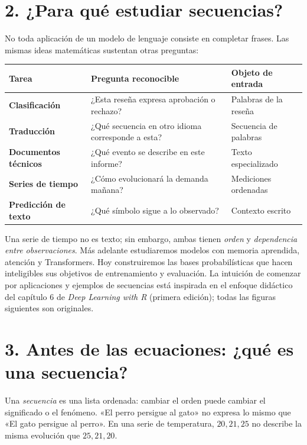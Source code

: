 \section*{2. ¿Para qué estudiar secuencias?}
No toda aplicación de un modelo de lenguaje consiste en completar frases. Las mismas ideas matemáticas sustentan otras preguntas:
\begin{center}
\begin{tabularx}{\textwidth}{>{\bfseries}p{3.0cm}X>{\raggedright\arraybackslash}p{3.4cm}}
\toprule Tarea & Pregunta reconocible & Objeto de entrada\\\midrule
Clasificación & ¿Esta reseña expresa aprobación o rechazo? & Palabras de la reseña\\
Traducción & ¿Qué secuencia en otro idioma corresponde a esta? & Secuencia de palabras\\
Documentos técnicos & ¿Qué evento se describe en este informe? & Texto especializado\\
Series de tiempo & ¿Cómo evolucionará la demanda mañana? & Mediciones ordenadas\\
Predicción de texto & ¿Qué símbolo sigue a lo observado? & Contexto escrito\\\bottomrule
\end{tabularx}
\end{center}
Una serie de tiempo no es texto; sin embargo, ambas tienen \emph{orden} y \emph{dependencia entre observaciones}. Más adelante estudiaremos modelos con memoria aprendida, atención y Transformers. Hoy construiremos las bases probabilísticas que hacen inteligibles sus objetivos de entrenamiento y evaluación. La intuición de comenzar por aplicaciones y ejemplos de secuencias está inspirada en el enfoque didáctico del capítulo 6 de \emph{Deep Learning with R} (primera edición); todas las figuras siguientes son originales.

\section*{3. Antes de las ecuaciones: ¿qué es una secuencia?}
Una \emph{secuencia} es una lista ordenada: cambiar el orden puede cambiar el significado o el fenómeno. «El perro persigue al gato» no expresa lo mismo que «El gato persigue al perro». En una serie de temperatura, $20,21,25$ no describe la misma evolución que $25,21,20$.

